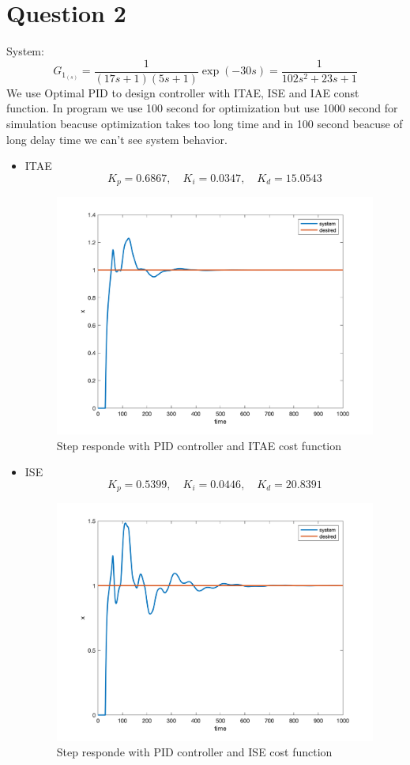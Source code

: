 \section{Question 2}
System:
$$
G_{1_{(s)}} = \dfrac{1}{(17s+1)(5s+1)}\exp(-30s) = \dfrac{1}{102s^2+23s+1}
$$
We use Optimal PID to design controller with ITAE, ISE and IAE const function. In program we use 100 second for optimization but use 1000 second for simulation beacuse optimization takes too long time and in 100 second beacuse of long delay time we can't see system behavior. 
\newpage
 \begin{itemize}
     \item ITAE
     $$
     K_p = 0.6867, \quad K_i = 0.0347, \quad K_d = 15.0543
     $$
     \begin{figure}[H]
        \caption{Step responde with PID controller and ITAE cost function}
        \centering
        \includegraphics[width=11cm]{../Figure/Q2/ITAE.png}
    \end{figure}
    \item ISE
    $$
    K_p =0.5399, \quad K_i = 0.0446, \quad  K_d =20.8391
    $$
    \begin{figure}[H]
       \caption{Step responde with PID controller and ISE cost function}
       \centering
       \includegraphics[width=11cm]{../Figure/Q2/ISE.png}

\end{figure}
\end{itemize}
